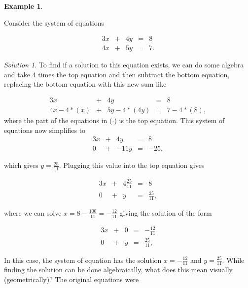 \documentclass[
]{book}
\theoremstyle{definition}
\theoremstyle{definition}
\newtheorem{example}{Example}[chapter]
\theoremstyle{definition}
\theoremstyle{remark}
\newtheorem*{solution}{Solution}
\begin{document}
\begin{example}
\protect\hypertarget{exm:unlabeled-div-49}{}\label{exm:unlabeled-div-49}

Consider the system of equations

\begin{alignat*}{3}
x   & {}+{} & 4 y & {}={} & 8 \\
4 x & {}+{} & 5 y & {}={} & 7.
\end{alignat*}

\end{example}

\begin{solution}

To find if a solution to this equation exists, we can do some algebra and take 4 times the top equation and then subtract the bottom equation, replacing the bottom equation with this new sum like

\begin{alignat*}{3}
x   & {}+{} & 4 y & {}={} & 8 \\
4 x - 4 * (x) & {}+{} & 5 y - 4 * (4y) & {}={} & 7 - 4 * (8),
\end{alignat*}
where the part of the equations in (\(\cdot\)) is the top equation. This system of equations now simplifies to
\begin{alignat*}{3}
x & {}+{} & 4 y & {}={} & 8 \\
0 & {}+{} & - 11y & {}={} & -25,
\end{alignat*}

which gives \(y = \frac{25}{11}\). Plugging this value into the top equation gives

\begin{alignat*}{3}
x & {}+{} & 4 \frac{25}{11} & {}={} & 8 \\
0 & {}+{} & y & {}={} & \frac{25}{11},
\end{alignat*}

where we can solve \(x = 8 - \frac{100}{11} = -\frac{12}{11}\) giving the solution of the form

\begin{alignat*}{3}
x & {}+{} & 0 & {}={} & -\frac{12}{11} \\
0 & {}+{} & y & {}={} & \frac{25}{11},
\end{alignat*}

In this case, the system of equation has the solution \(x = -\frac{12}{11}\) and \(y = \frac{25}{11}\). While finding the solution can be done algebraically, what does this mean visually (geometrically)? The original equations were


\end{solution}
\end{document}
